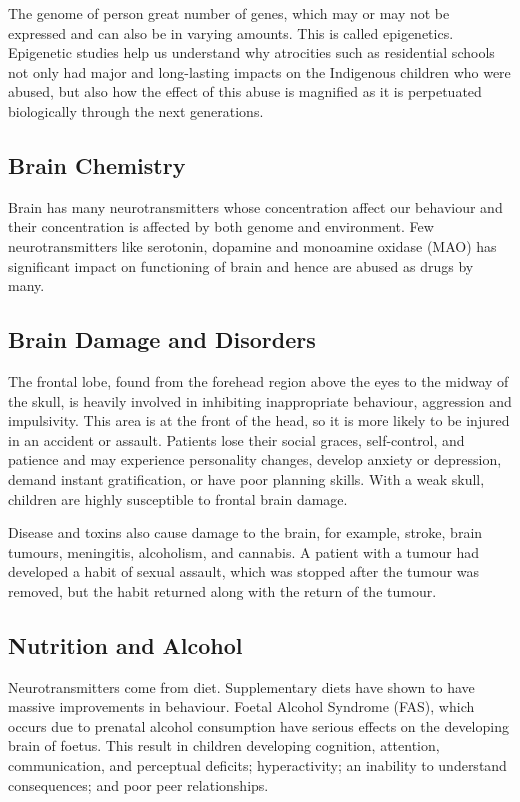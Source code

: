 \documentclass[11pt]{article}
\begin{document}
The genome of person great number of genes, which may or may not be expressed and can also be in varying amounts. This is called epigenetics. Epigenetic studies help us understand why atrocities such as residential schools not only had major and long-lasting impacts on the Indigenous children who were abused, but also how the effect of this abuse is magnified as it is perpetuated biologically through the next generations.

\subsection{Brain Chemistry}

Brain has many neurotransmitters whose concentration affect our  behaviour and their concentration is affected by both genome and environment. Few neurotransmitters like serotonin, dopamine and monoamine oxidase (MAO) has significant impact on functioning of brain and hence are abused as drugs by many.

\subsection{Brain Damage and Disorders}
The frontal lobe, found from the forehead region above the eyes to the midway of the skull, is heavily involved in inhibiting inappropriate behaviour, aggression and impulsivity. This area is at the front of the head, so it is more likely to be injured in an accident or assault. Patients lose their social graces, self-control, and patience and may experience personality changes, develop anxiety or depression, demand instant gratification, or have poor planning skills. With a weak skull, children are highly susceptible to frontal brain damage.

Disease and toxins also cause damage to the brain, for example, stroke, brain tumours, meningitis, alcoholism, and cannabis. A patient with a tumour had developed a habit of sexual assault, which was stopped after the tumour was removed, but the habit returned along with the return of the tumour.

\subsection{Nutrition and Alcohol}

Neurotransmitters come from diet. Supplementary diets have shown to have massive improvements in behaviour. Foetal Alcohol Syndrome (FAS), which occurs due to prenatal alcohol consumption have serious effects on the developing brain of foetus. This result in children developing cognition, attention, communication, and perceptual deficits; hyperactivity; an inability to understand consequences; and poor peer relationships.
\end{document}
